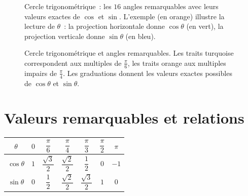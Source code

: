\begin{figure}[H]
\caption{Cercle trigonom\'etrique~: les $16$ angles remarquables avec leurs valeurs exactes de $\cos$ et $\sin$.
L'exemple (en orange) illustre la lecture de $\theta$~: la projection horizontale
donne $\cos\theta$ (en vert), la projection verticale donne $\sin\theta$ (en bleu).}
\end{figure}
\fi

\begin{figure}[H]
\centering

\caption{Cercle trigonom\'etrique et angles remarquables. Les traits turquoise
correspondent aux multiples de $\frac{\pi}{6}$, les traits orange aux
multiples impairs de $\frac{\pi}{4}$. Les graduations donnent les valeurs
exactes possibles de $\cos\theta$ et $\sin\theta$.}
\end{figure}

\section{Valeurs remarquables et relations}

\begin{prop}
\centering\renewcommand{\arraystretch}{1.8}
\begin{tabular}{|c|cccccc|}
\hline
\rowcolor{BN!12}
$\theta$ & $0$ & $\dfrac{\pi}{6}$ & $\dfrac{\pi}{4}$ & $\dfrac{\pi}{3}$ &
           $\dfrac{\pi}{2}$ & $\pi$ \\
\hline
$\cos\theta$ & $1$ & $\dfrac{\sqrt{3}}{2}$ & $\dfrac{\sqrt{2}}{2}$ &
              $\dfrac{1}{2}$ & $0$ & $-1$ \\[4pt]
$\sin\theta$ & $0$ & $\dfrac{1}{2}$ & $\dfrac{\sqrt{2}}{2}$ &
              $\dfrac{\sqrt{3}}{2}$ & $1$ & $0$ \\[4pt]
\hline
\end{tabular}
\end{prop}


